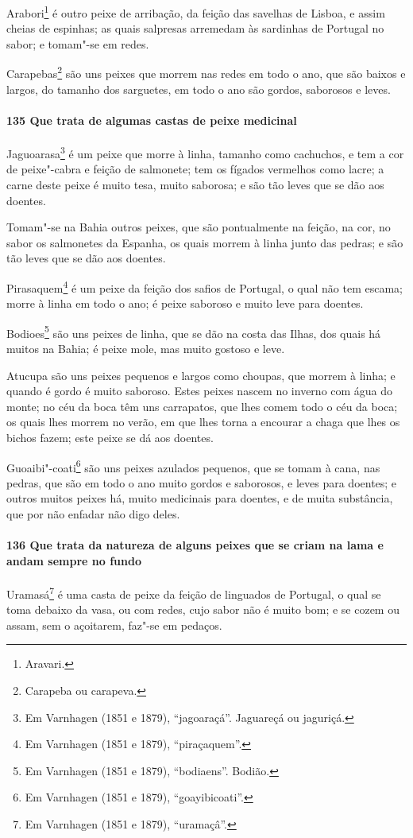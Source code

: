 \begin{linenumbers}
Arabori\footnote{ Aravari.} é outro peixe de arribação, da feição das savelhas de Lisboa,
e assim cheias de espinhas; as quais salpresas arremedam às sardinhas de Portugal no
sabor; e tomam"-se em redes.

Carapebas\footnote{ Carapeba ou carapeva.} são uns peixes que morrem nas redes em todo o
ano, que são baixos e largos, do tamanho dos sarguetes, em todo o ano são gordos,
saborosos e leves.

\paragraph{135 Que trata de algumas castas de peixe medicinal}\quad
Jaguoarasa\footnote{ Em Varnhagen (1851 e 1879), ``jagoaraçá''. Jaguareçá ou jaguriçá.} é
um peixe que morre à linha, tamanho como cachuchos, e tem a cor de peixe"-cabra e feição de
salmonete; tem os fígados vermelhos como lacre; a carne deste peixe é muito tesa, muito
saborosa; e são tão leves que se dão aos doentes.

Tomam"-se na Bahia outros peixes, que são pontualmente na feição, na cor, no sabor os
salmonetes da Espanha, os quais morrem à linha junto das pedras; e são tão leves que se
dão aos doentes.

Pirasaquem\footnote{ Em Varnhagen (1851 e 1879), ``piraçaquem''.} é um peixe da feição dos
safios de Portugal, o qual não tem escama; morre à linha em todo o ano; é peixe saboroso e
muito leve para doentes.

Bodioes\footnote{ Em Varnhagen (1851 e 1879), ``bodiaens''. Bodião.} são uns peixes de
linha, que se dão na costa das Ilhas, dos quais há muitos na Bahia; é peixe mole, mas
muito gostoso e leve.

Atucupa são uns peixes pequenos e largos como choupas, que morrem à linha; e quando é
gordo é muito saboroso. Estes peixes nascem no inverno com água do monte; no céu da boca
têm uns carrapatos, que lhes comem todo o céu da boca; os quais lhes morrem no verão, em
que lhes torna a encourar a chaga que lhes os bichos fazem; este peixe se dá aos doentes.

Guoaibi"-coati\footnote{ Em Varnhagen (1851 e 1879), ``goayibicoati''.} são uns peixes
azulados pequenos, que se tomam à cana, nas pedras, que são em todo o ano muito gordos e
saborosos, e leves para doentes; e outros muitos peixes há, muito medicinais para doentes,
e de muita substância, que por não enfadar não digo deles.

\paragraph{136 Que trata da natureza de alguns peixes que se criam na lama e andam sempre
no fundo}\quad
Uramasá\footnote{ Em Varnhagen (1851 e 1879), ``uramaçâ''.} é uma casta de peixe da feição
de linguados de Portugal, o qual se toma debaixo da vasa, ou com redes, cujo sabor não é
muito bom; e se cozem ou assam, sem o açoitarem, faz"-se em pedaços.


\end{linenumbers}

